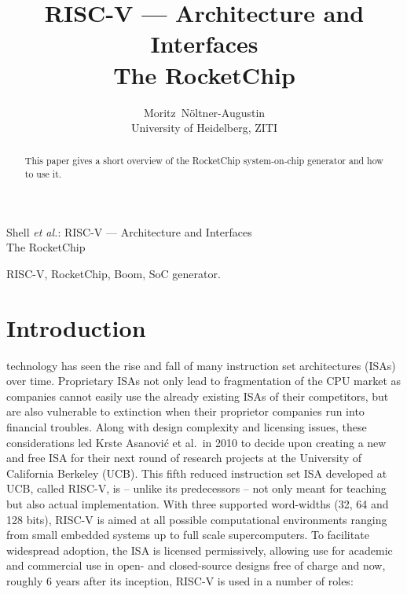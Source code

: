 \documentclass[journal,a4paper]{IEEEtran}
\def\krste/{Krste Asanovi\'c}
\begin{document}


\title{RISC-V --- Architecture and Interfaces\\The RocketChip}


\author{Moritz~N\"oltner-Augustin\\%
University of Heidelberg, ZITI}

%
{Shell \MakeLowercase{\textit{et al.}}: RISC-V --- Architecture and Interfaces\\The RocketChip}

\maketitle

\begin{abstract}
	This paper gives a short overview of the RocketChip system-on-chip generator and how to use it.
\end{abstract}

\begin{IEEEkeywords}
	RISC-V, RocketChip, Boom, SoC generator.
\end{IEEEkeywords}


\section{Introduction}
 technology has seen the rise and fall of many instruction set architectures (ISAs) over time.
Proprietary ISAs not only lead to fragmentation of the CPU market as companies cannot easily use the already existing ISAs of their competitors, but are also vulnerable to extinction when their proprietor companies run into financial troubles.
Along with design complexity and licensing issues, these considerations led \krste/ et al.\ in 2010 to decide upon creating a new and free ISA for their next round of research projects at the University of California Berkeley (UCB).
This fifth reduced instruction set ISA developed at UCB, called RISC-V\cite{riscv}, is -- unlike its predecessors -- not only meant for teaching but also actual implementation.
With three supported word-widths (32, 64 and 128 bits\cite[Time: 17:06]{riscv-vid}), RISC-V is aimed at all possible computational environments ranging from small embedded systems up to full scale supercomputers.
To facilitate widespread adoption, the ISA is licensed permissively, allowing use for academic and commercial use in open- and closed-source designs free of charge and now, roughly 6 years after its inception, RISC-V is used in a number of roles:
\end{document}

